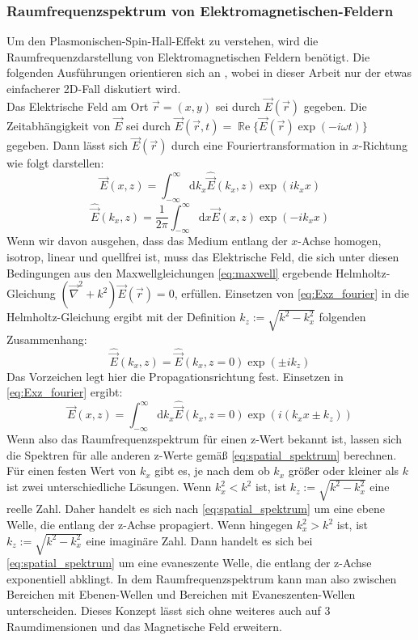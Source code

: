 \documentclass[titlepage]{article}
\renewcommand{\Re}{\operatorname{\mathbb{R}e}}
\begin{document}
	\subsubsection{Raumfrequenzspektrum von Elektromagnetischen-Feldern}
		Um den Plasmonischen-Spin-Hall-Effekt zu verstehen, wird die Raumfrequenzdarstellung von Elektromagnetischen Feldern benötigt. Die folgenden Ausführungen orientieren sich an \cite{Novotny.2012b}, wobei in dieser Arbeit nur der etwas einfacherer 2D-Fall diskutiert wird.\\		
		Das Elektrische Feld am Ort $\vec{r} = (x, y) $ sei durch $\vec{E}({\vec{r}})$ gegeben.
		Die Zeitabhängigkeit von $\vec{E}$ sei durch $\vec{E}({\vec{r}, t})=\Re\{\vec{E}({\vec{r}})\exp(-i\omega t)\}$ gegeben. Dann lässt sich $\vec{E}({\vec{r}})$ durch eine Fouriertransformation in $x$-Richtung wie folgt darstellen:
		\begin{equation}
			\label{eq:Exz_fourier}
			\vec{E}(x,z) = \int_{-\infty}^{\infty}\mathrm{d}{k_x}\hat{\vec{E}}(k_x,z)\exp(ik_xx)				
		\end{equation}
		\begin{equation}
			\label{eq:EKxz_fourier}
			\hat{\vec{E}}(k_x,z) = \dfrac{1}{2\pi}\int_{-\infty}^{\infty}\mathrm{d}x\vec{E}(x,z)\exp(-ik_xx)
		\end{equation}
		Wenn wir davon ausgehen, dass das Medium entlang der $x$-Achse homogen, isotrop, linear und quellfrei ist, muss das Elektrische Feld, die sich unter diesen Bedingungen aus den Maxwellgleichungen \eqref{eq:maxwell} ergebende Helmholtz-Gleichung $(\vec{\nabla}^2+k^2)\vec{E}({\vec{r}}) = 0$, erfüllen. Einsetzen von \eqref{eq:Exz_fourier} in die Helmholtz-Gleichung ergibt mit der Definition $k_z := \sqrt{k^2-k_x^2}$ folgenden Zusammenhang:
		\begin{equation}
			\label{eq:spatial_spektrum}
		\hat{\vec{E}}(k_x,z) =\hat{\vec{E}}(k_x,z= 0) \exp(\pm ik_ z)
		\end{equation}
	Das Vorzeichen legt hier die Propagationsrichtung fest.
	Einsetzen in \eqref{eq:Exz_fourier} ergibt:
		\begin{equation}
			\label{eq:Espatial_spektrum}
			\vec{E}(x,z) = \int_{-\infty}^{\infty}\mathrm{d}{k_x}\hat{\vec{E}}(k_x,z= 0)\exp(i(k_xx\pm k_ z))
		\end{equation}
	Wenn also das Raumfrequenzspektrum für einen z-Wert bekannt ist, lassen sich die Spektren für alle anderen z-Werte gemäß \eqref{eq:spatial_spektrum} berechnen. Für einen festen Wert von $k_x$ gibt es, je nach dem ob $k_x$ größer oder kleiner als $k$ ist zwei unterschiedliche Lösungen. Wenn $k_x^2 < k^2$ ist, ist $k_z := \sqrt{k^2-k_x^2}$ eine reelle Zahl. Daher handelt es sich nach \eqref{eq:spatial_spektrum} um eine ebene Welle, die entlang der z-Achse propagiert.
	Wenn hingegen $k_x^2 > k^2$ ist, ist $k_z := \sqrt{k^2-k_x^2}$ eine imaginäre Zahl. Dann handelt es sich bei \eqref{eq:spatial_spektrum} um eine evaneszente Welle, die entlang der z-Achse exponentiell abklingt. In dem Raumfrequenzspektrum kann man also zwischen Bereichen mit Ebenen-Wellen und  Bereichen mit Evaneszenten-Wellen unterscheiden. Dieses Konzept lässt sich ohne weiteres auch auf 3 Raumdimensionen und das Magnetische Feld erweitern.
\end{document}
